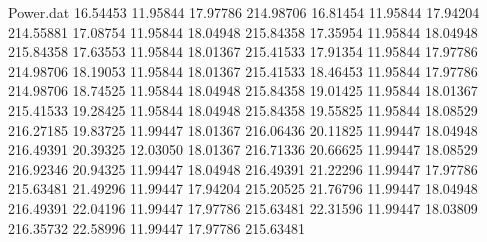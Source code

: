 \begin{filecontents}{Power.dat}
  16.54453   11.95844   17.97786  214.98706
  16.81454   11.95844   17.94204  214.55881
  17.08754   11.95844   18.04948  215.84358
  17.35954   11.95844   18.04948  215.84358
  17.63553   11.95844   18.01367  215.41533
  17.91354   11.95844   17.97786  214.98706
  18.19053   11.95844   18.01367  215.41533
  18.46453   11.95844   17.97786  214.98706
  18.74525   11.95844   18.04948  215.84358
  19.01425   11.95844   18.01367  215.41533
  19.28425   11.95844   18.04948  215.84358
  19.55825   11.95844   18.08529  216.27185
  19.83725   11.99447   18.01367  216.06436
  20.11825   11.99447   18.04948  216.49391
  20.39325   12.03050   18.01367  216.71336
  20.66625   11.99447   18.08529  216.92346
  20.94325   11.99447   18.04948  216.49391
  21.22296   11.99447   17.97786  215.63481
  21.49296   11.99447   17.94204  215.20525
  21.76796   11.99447   18.04948  216.49391
  22.04196   11.99447   17.97786  215.63481
  22.31596   11.99447   18.03809  216.35732
  22.58996   11.99447   17.97786  215.63481
\end{filecontents}
